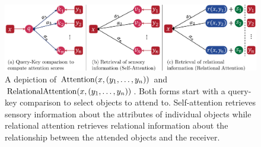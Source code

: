 \begin{figure}[t]
  \includegraphics[width=\textwidth]{figs/attn_fig_combined.pdf}
  \caption{A depiction of $\mathrm{Attention}(x, (y_1, \ldots, y_n))$ and $\mathrm{RelationalAttention}(x, (y_1, \ldots, y_n))$. Both forms start with a query-key comparison to select objects to attend to. Self-attention retrieves sensory information about the attributes of individual objects while relational attention retrieves relational information about the relationship between the attended objects and the receiver.}\label{fig:selfattn_relattn}
\end{figure}
